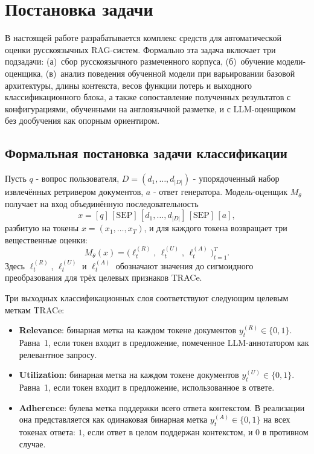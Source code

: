\section{Постановка задачи}
\label{sec:problem}

В настоящей работе разрабатывается комплекс средств для автоматической оценки
русскоязычных RAG-систем. Формально эта задача включает три подзадачи:
(а)~сбор русскоязычного размеченного корпуса,
(б)~обучение модели-оценщика,
(в)~анализ поведения обученной модели при варьировании базовой архитектуры,
длины контекста, весов функции потерь и выходного классификационного блока, а также
сопоставление полученных результатов с конфигурациями, обученными на
англоязычной разметке, и с LLM-оценщиком без дообучения как опорным ориентиром.


\subsection{Формальная постановка задачи классификации}

Пусть $q$ - вопрос пользователя, $D = (d_1, \dots, d_{|D|})$ - упорядоченный
набор извлечённых ретривером документов, $a$ - ответ генератора. 
Модель-оценщик $M_\theta$ получает на вход объединённую последовательность
\[
x = [q]\,[\text{SEP}]\,[d_1, \dots, d_{|D|}]\,[\text{SEP}]\,[a],
\]
разбитую на токены $x = (x_1, \dots, x_T)$, и для каждого токена возвращает
три вещественные оценки:
\[
M_\theta(x) = \bigl(\ell^{(R)}_t,\, \ell^{(U)}_t,\, \ell^{(A)}_t\bigr)_{t=1}^{T}.
\]
Здесь $\ell^{(R)}_t$, $\ell^{(U)}_t$ и $\ell^{(A)}_t$ обозначают значения
до сигмоидного преобразования для трёх целевых признаков TRACe.

Три выходных классификационных слоя соответствуют следующим целевым меткам TRACe:

\begin{itemize}
  \item \textbf{Relevance}: бинарная метка на каждом токене документов $y^{(R)}_t \in \{0, 1\}$. 
  Равна~1, если токен входит в предложение, помеченное LLM-аннотатором как релевантное запросу.
  \item \textbf{Utilization}: бинарная метка на каждом токене документов $y^{(U)}_t \in \{0, 1\}$. 
  Равна~1, если токен входит в предложение, использованное в ответе.
    \item \textbf{Adherence}: булева метка поддержки всего ответа контекстом.
  В реализации она представляется как одинаковая бинарная метка
  $y^{(A)}_t \in \{0, 1\}$ на всех токенах ответа: $1$, если ответ в целом
  поддержан контекстом, и $0$ в противном случае.

\end{itemize}

